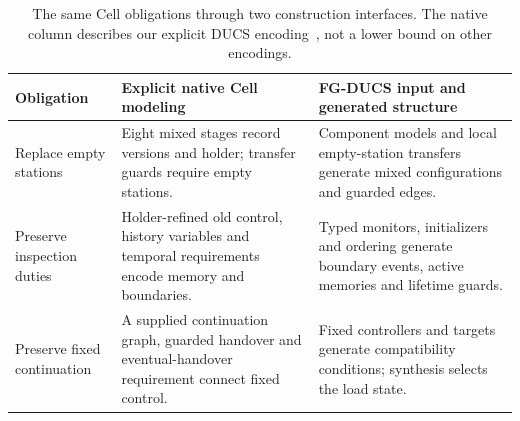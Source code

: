 \begin{table}[!htbp]
\caption{The same Cell obligations through two construction interfaces. The native column describes our explicit DUCS encoding~\cite[Defs.~4.1--4.3]{Nahabedian2020}, not a lower bound on other encodings.}
\label{tab:contract-responsibility}\label{tab:ducs-interface}
\centering\small
\begin{tabular}{@{}p{.16\linewidth}p{.39\linewidth}p{.39\linewidth}@{}}\toprule
Obligation & Explicit native Cell modeling & FG-DUCS input and generated structure\\\midrule
Replace empty stations & Eight mixed stages record versions and holder; transfer guards require empty stations. & Component models and local empty-station transfers generate mixed configurations and guarded edges.\\
Preserve inspection duties & Holder-refined old control, history variables and temporal requirements encode memory and boundaries. & Typed monitors, initializers and ordering generate boundary events, active memories and lifetime guards.\\
Preserve fixed continuation & A supplied continuation graph, guarded handover and eventual-handover requirement connect fixed control. & Fixed controllers and targets generate compatibility conditions; synthesis selects the load state.\\\bottomrule
\end{tabular}
\par{}
\end{table}
